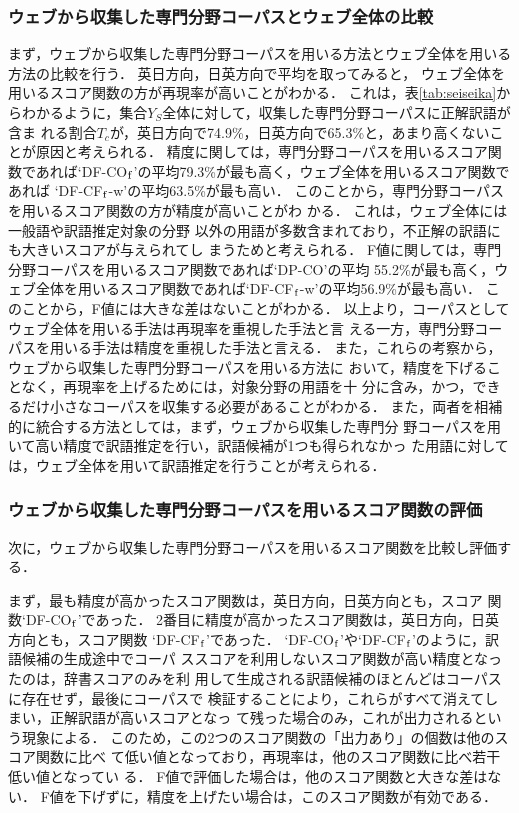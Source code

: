 \documentclass[japanese]{jnlp_1.3a}
\begin{document}
\subsubsection*{ウェブから収集した専門分野コーパスとウェブ全体の比較}
まず，ウェブから収集した専門分野コーパスを用いる方法とウェブ全体を用いる
方法の比較を行う．
英日方向，日英方向で平均を取ってみると，
ウェブ全体を用いるスコア関数の方が再現率が高いことがわかる．
これは，表\ref{tab:seiseika}からわかるように，集合$Y_S$全体に対して，収集した専門分野コーパスに正解訳語が含ま
れる割合$T_c$が，英日方向で74.9\%，日英方向で65.3\%と，あまり高くないこ
とが原因と考えられる．
精度に関しては，専門分野コーパスを用いるスコア関数であれば`DF-CO${\rm
_f}$'の平均79.3\%が最も高く，ウェブ全体を用いるスコア関数であれば
`DF-CF${\rm _f}$-w'の平均63.5\%が最も高い．
このことから，専門分野コーパスを用いるスコア関数の方が精度が高いことがわ
かる．
これは，ウェブ全体には一般語や訳語推定対象の分野
以外の用語が多数含まれており，不正解の訳語にも大きいスコアが与えられてし
まうためと考えられる．
F値に関しては，専門分野コーパスを用いるスコア関数であれば`DP-CO'の平均
55.2\%が最も高く，ウェブ全体を用いるスコア関数であれば`DF-CF${\rm
_f}$-w'の平均56.9\%が最も高い．
このことから，F値には大きな差はないことがわかる．
以上より，コーパスとしてウェブ全体を用いる手法は再現率を重視した手法と言
える一方，専門分野コーパスを用いる手法は精度を重視した手法と言える．
また，これらの考察から，ウェブから収集した専門分野コーパスを用いる方法に
おいて，精度を下げることなく，再現率を上げるためには，対象分野の用語を十
分に含み，かつ，できるだけ小さなコーパスを収集する必要があることがわかる．
また，両者を相補的に統合する方法としては，まず，ウェブから収集した専門分
野コーパスを用いて高い精度で訳語推定を行い，訳語候補が1つも得られなかっ
た用語に対しては，ウェブ全体を用いて訳語推定を行うことが考えられる．

\subsubsection*{ウェブから収集した専門分野コーパスを用いるスコア関数の評価}
次に，ウェブから収集した専門分野コーパスを用いるスコア関数を比較し評価する．

まず，最も精度が高かったスコア関数は，英日方向，日英方向とも，スコア
関数`DF-CO${\rm _f}$'であった．
2番目に精度が高かったスコア関数は，英日方向，日英方向とも，スコア関数
`DF-CF${\rm _f}$'であった．
`DF-CO${\rm _f}$'や`DF-CF${\rm _f}$'のように，訳語候補の生成途中でコーパ
ススコアを利用しないスコア関数が高い精度となったのは，辞書スコアのみを利
用して生成される訳語候補のほとんどはコーパスに存在せず，最後にコーパスで
検証することにより，これらがすべて消えてしまい，正解訳語が高いスコアとなっ
て残った場合のみ，これが出力されるという現象による．
このため，この2つのスコア関数の「出力あり」の個数は他のスコア関数に比べ
て低い値となっており，再現率は，他のスコア関数に比べ若干低い値となってい
る．
F値で評価した場合は，他のスコア関数と大きな差はない．
F値を下げずに，精度を上げたい場合は，このスコア関数が有効である．
\end{document}
